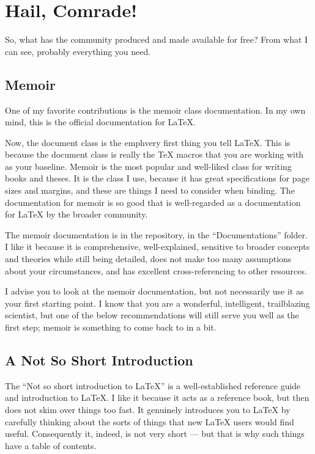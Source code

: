 \documentclass[12pt, oneside]{memoir}
\begin{document}
\section*{Hail, Comrade!}
So, what has the community produced and made available for free? From what I can see, probably everything you need.\\

\subsection*{Memoir}

One of my favorite contributions is the memoir class documentation. In my own mind, this is the official documentation for \LaTeX{}.

Now, the document class is the emph{very first thing} you tell \LaTeX{}. This is because the document class is really the \TeX{} macros that you are working with as your baseline. Memoir is the most popular and well-liked class for writing books and theses. It is the class I use, because it has great specifications for page sizes and margins, and these are things I need to consider when binding. The documentation for memoir is so good that is well-regarded as a documentation for \LaTeX{} by the broader community.

The memoir documentation is in the repository, in the  ``Documentations'' folder. I like it because it is comprehensive, well-explained, sensitive to broader concepts and theories while still being detailed, does not make too many assumptions about your circumstances, and has excellent cross-referencing to other resources.

I advise you to look at the memoir documentation, but not necessarily use it as your first starting point. I know that you are a wonderful, intelligent, trailblazing scientist, but one of the below recommendations will still serve you well as the first step; memoir is something to come back to in a bit.\\

\subsection{A Not So Short Introduction}

The ``Not so short introduction to \LaTeX{}'' is a well-established reference guide and introduction to \LaTeX{}. I like it because it acts as a reference book, but then does not skim over things too fast. It genuinely introduces you to \LaTeX{} by carefully thinking about the sorts of things that new \LaTeX{} users would find useful. Consequently it, indeed, is not very short — but that is why such things have a table of contents.
\end{document}
